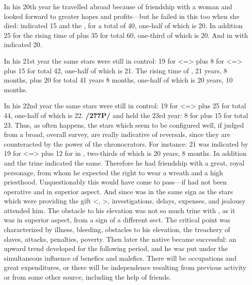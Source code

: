 In his 20th year he travelled abroad because of friendship with
a woman and looked forward to greater hopes and profits—but he failed in this too when she died: \Mars \xspace indicated 15 and the \Moon\xspace 25, for a total of 40, one-half of which is 20. In addition 25 for the rising time of \Taurus\xspace plus 35 for \Leo\xspace total 60, one-third of which is 20. And \Mercury\xspace in \Aries\xspace with \Saturn\xspace indicated 20. 

In his 21st year the same stars were still in control: 19 for \Leo\xspace <=\Sun> plus 8 for \Taurus\xspace <=\Venus> plus 15 for \Mars\xspace total 42, one-half of which is 21. The rising time of \Aries, 21 years, 8 months, plus 20 for \Mercury\xspace total 41 years 8 months, one-half of which is 20 years, 10 months. 

In his 22nd year the same stars were still in control: 19 for \Leo\xspace <=\Sun> plus 25 for \Taurus\xspace total 44, one-half of which is 22. \textbf{/277P/} \Venus\xspace and \Mars\xspace held the 23rd year: 8 for \Venus\xspace plus 15 for \Mars\xspace total 23. Thus, as often happens, the stars which seem to be configured well, if judged from a broad, overall survey, are really indicative of reversals, since they are counteracted by the power of the chronocrators. For instance: 21 was indicated by 19 for \Leo\xspace <=\Sun> plus 12 for \Jupiter\xspace in \Leo, two-thirds of which is 20 years, 8 months. In addition \Jupiter\xspace and the \Sun\xspace trine indicated the same. Therefore he had friendship with a great, royal personage, from whom he expected the right to wear a wreath and a high priesthood. Unquestionably this would have come to pass—if \Mars\xspace had not been operative and in superior aspect. And since \Saturn\xspace was in the same sign as the stars which were providing the gift <\Sun, \Mercury>, investigations, delays, expenses, and jealousy attended him. The obstacle to his elevation was not so much \Saturn\xspace trine with \Jupiter, as it was \Mars\xspace in superior aspect, from a sign of a different sect. The critical point was characterized by illness, bleeding, obstacles to his elevation, the treachery of slaves, attacks, penalties, poverty. Then later the native became successful: an upward trend developed for the
following period, and he was put under the simultaneous influence of benefics and malefics. There will be occupations and great expenditures, or there will be independence resulting from previous activity or from some other source, including the help of friends.

